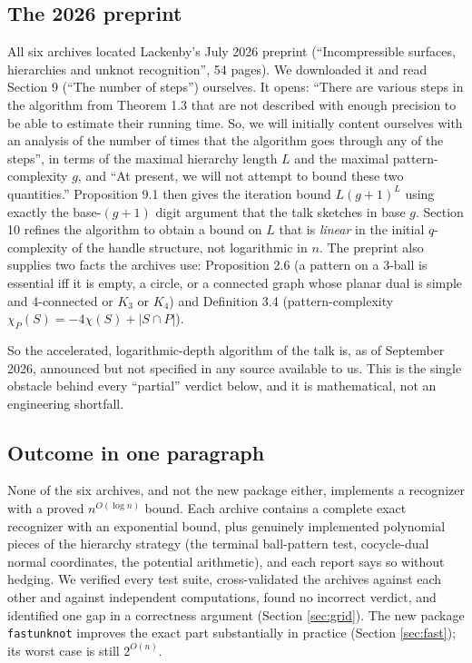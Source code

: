 \documentclass[11pt]{article}
\theoremstyle{remark}
\newcommand{\code}[1]{\texttt{#1}}
\newcommand{\qp}{n^{O(\log n)}}
\begin{document}
\subsection{The 2026 preprint}
All six archives located Lackenby's July 2026 preprint \cite{lackenby2026}
(``Incompressible surfaces, hierarchies and unknot recognition'', 54 pages).
We downloaded it and read Section 9 (``The number of steps'') ourselves. It
opens: ``There are various steps in the algorithm from Theorem 1.3 that are
not described with enough precision to be able to estimate their running
time. So, we will initially content ourselves with an analysis of the number
of times that the algorithm goes through any of the steps'', in terms of the
maximal hierarchy length $L$ and the maximal pattern-complexity $g$, and ``At
present, we will not attempt to bound these two quantities.'' Proposition 9.1
then gives the iteration bound $L(g+1)^L$ using exactly the base-$(g+1)$
digit argument that the talk sketches in base $g$. Section 10 refines the
algorithm to obtain a bound on $L$ that is \emph{linear} in the initial
$q$-complexity of the handle structure, not logarithmic in $n$. The preprint
also supplies two facts the archives use: Proposition 2.6 (a pattern on a
3-ball is essential iff it is empty, a circle, or a connected graph whose
planar dual is simple and 4-connected or $K_3$ or $K_4$) and Definition 3.4
(pattern-complexity $\chi_P(S)=-4\chi(S)+|S\cap P|$).

So the accelerated, logarithmic-depth algorithm of the talk is, as of
September 2026, announced but not specified in any source available to us.
This is the single obstacle behind every ``partial'' verdict below, and it is
mathematical, not an engineering shortfall.

\subsection{Outcome in one paragraph}
None of the six archives, and not the new package either, implements a
recognizer with a proved $\qp$ bound. Each archive contains a complete exact
recognizer with an exponential bound, plus genuinely implemented polynomial
pieces of the hierarchy strategy (the terminal ball-pattern test, cocycle-dual
normal coordinates, the potential arithmetic), and each report says so
without hedging. We verified every test suite, cross-validated the archives
against each other and against independent computations, found no incorrect
verdict, and identified one gap in a correctness argument (Section
\ref{sec:grid}). The new package \code{fastunknot} improves the exact part
substantially in practice (Section \ref{sec:fast}); its worst case is still
$2^{O(n)}$.
\end{document}
